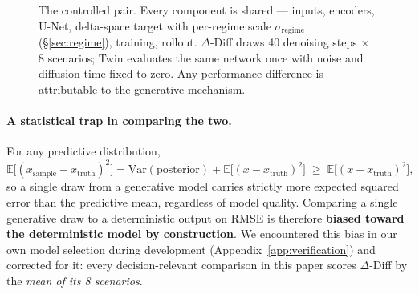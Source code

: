 \documentclass[11pt]{article}
\newcommand{\ours}{\mbox{$\Delta$-Diff}}
\newcommand{\twin}{\mbox{Twin}}
\begin{document}
\begin{figure}[H]
{%
}
\caption{The controlled pair. Every component is shared --- inputs,
encoders, U-Net, delta-space target with per-regime scale
$\sigma_{\mathrm{regime}}$ (\S\ref{sec:regime}), training, rollout.
\ours{} draws 40 denoising steps $\times$ 8 scenarios; \twin{} evaluates
the same network once with noise and diffusion time fixed to zero. Any
performance difference is attributable to the generative mechanism.}
\label{fig:pair}
\end{figure}

\paragraph{A statistical trap in comparing the two.}
For any predictive distribution,
\begin{equation}
\mathbb{E}\big[(x_{\text{sample}} - x_{\text{truth}})^2\big]
  = \mathrm{Var}(\text{posterior}) + \mathbb{E}\big[(\bar{x} - x_{\text{truth}})^2\big]
  \;\geq\; \mathbb{E}\big[(\bar{x} - x_{\text{truth}})^2\big],
\end{equation}
so a single draw from a generative model carries strictly more expected
squared error than the predictive mean, regardless of model quality.
Comparing a single generative draw to a deterministic output on RMSE is
therefore \textbf{biased toward the deterministic model by construction}.
We encountered this bias in our own model selection during development
(Appendix~\ref{app:verification}) and corrected for it: every
decision-relevant comparison in this paper scores \ours{} by the
\emph{mean of its 8 scenarios}.
\end{document}
